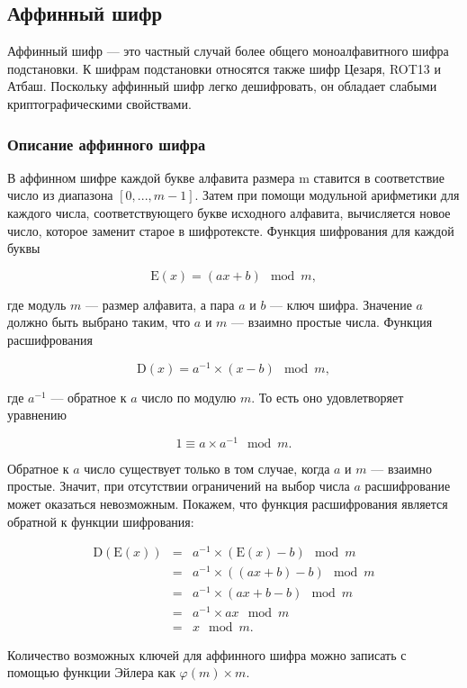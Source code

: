 \subsection{Аффинный шифр}

Аффинный шифр --- это частный случай более общего моноалфавитного шифра 
подстановки. К шифрам подстановки относятся также шифр Цезаря, 
ROT13 и Атбаш. Поскольку аффинный шифр легко дешифровать, 
он обладает слабыми криптографическими свойствами.

\subsubsection{Описание аффинного шифра}

В аффинном шифре каждой букве алфавита размера m ставится в 
соответствие число из диапазона $[0, ..., m - 1]$. 
Затем при помощи модульной арифметики для каждого числа, соответствующего 
букве исходного алфавита, вычисляется новое число, которое заменит 
старое в шифротексте. Функция шифрования для каждой буквы

    $$\mbox{E}(x) = (ax + b) \mod{m},$$

где модуль $m$ --- размер алфавита, а пара $a$ и $b$ --- ключ шифра. Значение 
$a$ должно быть выбрано таким, что $a$ и $m$ --- 
взаимно простые числа. Функция 
расшифрования

    $$\mbox{D}(x) = a^{-1} \times (x - b) \mod{m},$$

где $a^{-1}$ --- обратное к $a$ число по модулю $m$. 
То есть оно удовлетворяет уравнению

    $$1 \equiv a \times a^{-1} \mod{m}.$$

Обратное к $a$ число существует только в том случае, когда 
$a$ и $m$ --- взаимно 
простые. Значит, при отсутствии ограничений на выбор числа $a$ 
расшифрование 
может оказаться невозможным. Покажем, что функция расшифрования является 
обратной к функции шифрования:

$$\begin{matrix}
    \mbox{D}(\mbox{E}(x)) 
      &= &a^{-1} \times (\mbox{E}(x) - b) \mod{m} \\ 
      &= &a^{-1} \times ((ax + b) - b) \mod{m} \\ 
      &= &a^{-1} \times (ax + b - b) \mod{m} \\ 
      &= &a^{-1} \times ax \mod{m}\\ 
      &= &x \mod{m}. 
\end{matrix}$$

Количество возможных ключей для аффинного шифра можно записать 
с помощью функции Эйлера как $\varphi(m) \times m$.

